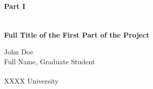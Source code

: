 \documentclass[letterpaper, 12pt, oneside]{book}
\theoremstyle{plain}
\theoremstyle{definition}
\theoremstyle{remark}
\begin{document}
\begin{titlepage}
\centering
\quad \\
\quad \\
\quad \\
\quad \\
\quad \\
\quad \\
\begingroup
    \fontsize{18pt}{20pt}\selectfont
    \textbf{Part I} \\
    \quad \\
    \quad \\
    \textbf{Full Title of the First Part of the Project}
\endgroup


\vspace{80pt}

\begingroup
\fontsize{16pt}{20pt}\selectfont
John Doe\\
Full Name, Graduate Student\\
\quad \\
XXXX University    
\endgroup


\end{titlepage}
\end{document}
